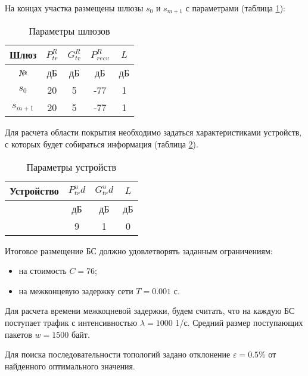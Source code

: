 На концах участка размещены шлюзы $s_0 $ и $s_{m+1}$ с параметрами (таблица \cref{tab:part4_gateway_parameters}):

\begin{table}[h!]\centering
  \begin{tabular}{|c||c|c|c|c|}\hline
      
      Шлюз&	$P_{tr}^R$&	$G_{tr}^R$&	$P_{recv}^R$&	$L$ \\
      \hline
      №&	дБ&	дБ&	дБ&	дБ \\
      \hline
      $s_0 $&	20&	5&	-77&	1 \\
      $s_{m+1}$&	20&	5&	-77&	1 \\
      \hline

\end{tabular}\caption{Параметры шлюзов}\label{tab:part4_gateway_parameters}
\end{table}

Для расчета области покрытия необходимо задаться характеристиками устройств, с которых будет собираться информация (таблица \cref{tab:part4_user_device_parameters}).


\begin{table}[h!]\centering
  \begin{tabular}{|c||c|c|c|}\hline
      
    Устройство&	$P_{tr}^ud$&	$G_{tr}^ud$&	$L$ \\
    \hline
    &	дБ&	дБ&	дБ	 \\
    \hline
    &	9&	1&	0 \\

    \hline

\end{tabular}\caption{Параметры устройств}\label{tab:part4_user_device_parameters}
\end{table}


Итоговое размещение БС должно удовлетворять заданным ограничениям:
\begin{itemize}
  \item на стоимость $C = 76$;
  \item на межконцевую задержку сети $T =0.001$ с.
\end{itemize}
Для расчета времени межкоцневой задержки, будем считать, что на каждую БС поступает трафик с интенсивностью $\lambda = 1000$ 1/с. Средний размер поступающих пакетов $w=1500$ байт.

Для поиска последовательности топологий задано отклонение $\varepsilon=0.5$\% от найденного оптимального значения.

